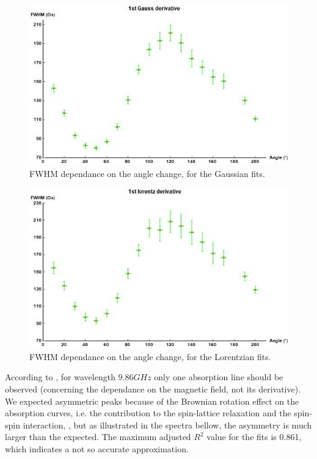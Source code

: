 \documentclass[openany,11pt,a4paper]{report}
\begin{document}
\begin{figure}[H]
\centering
\includegraphics[scale=0.7]{fwhmgauss.jpg}
\caption{FWHM dependance on the angle change, for the Gaussian fits.}
\end{figure}




\begin{figure}[H]
\centering
\includegraphics[scale=0.7]{fwhmlore.jpg}
\caption{FWHM dependance on the angle change, for the Lorentzian fits.}
\end{figure}




According to \cite{general}, for wavelength $9.86 GHz$ only one absorption line should be observed (concerning the dependance on the magnetic field, not its derivative). We expected asymmetric peaks because of the Brownian rotation effect on the absorption curves, i.e. the contribution to the spin-lattice relaxation and the spin-spin interaction,  \cite{viscous_liquids} , but as illustrated in the spectra bellow, the asymmetry is much larger than the expected. The maximum adjusted $R^{2}$ value for the fits is 0.861, which indicates a not so accurate approximation.
\end{document}
